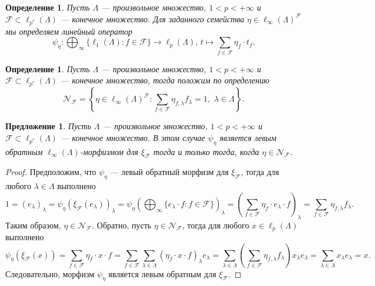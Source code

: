 \documentclass[12pt]{article}
\newtheorem{proposition}[theorem]{Предложение}
\newtheorem{definition}[theorem]{Определение}
\begin{document}
\begin{definition}\label{ParamExtMorph}
    Пусть $\Lambda$ --- произвольное множество, $1<p<+\infty$ 
    и $\mathcal{F}\subset \ell_{p^*}(\Lambda)$ --- 
    конечное множество. Для заданного семейства 
    $\eta\in \ell_\infty(\Lambda)^\mathcal{F}$ мы определяем линейный оператор
    \[
        \psi_{\eta}:
        \bigoplus_\infty\{\ell_1(\Lambda):f\in\mathcal{F}\}\to\ell_p(\Lambda),\,
        t\mapsto\sum_{f\in\mathcal{F}} \eta_f\cdot t_f.
    \]
\end{definition}

\begin{definition}\label{ExtMorphs}
    Пусть $\Lambda$ --- произвольное множество, $1<p<+\infty$ 
    и $\mathcal{F}\subset\ell_{p^*}(\Lambda)$ --- 
    конечное множество, тогда положим по определению
    \[
        \mathcal{N}_{\mathcal{F}}=\left\{
            \eta\in \ell_\infty(\Lambda)^{\mathcal{F}} : 
            \sum_{f\in\mathcal{F}} \eta_{f,\lambda}f_\lambda=1,\,\,
            \lambda\in\Lambda
        \right\}.
    \]
\end{definition}

\begin{proposition}\label{StdEmbdLeftInvCharac}
    Пусть $\Lambda$ --- произвольное множество, $1<p<+\infty$ 
    и $\mathcal{F}\subset\ell_{p^*}(\Lambda)$ --- 
    конечное множество. В этом случае $\psi_\eta$ является левым 
    обратным $\ell_\infty(\Lambda)$-морфизмом для $\xi_{\mathcal{F}}$ тогда и 
    только тогда, когда $\eta\in\mathcal{N}_{\mathcal{F}}$.
\end{proposition}
\begin{proof} 
    Предположим, что $\psi_{\eta}$ --- левый обратный морфизм 
    для $\xi_{\mathcal{F}}$, тогда для любого $\lambda\in\Lambda$ выполнено
    \[
        1=(e_\lambda)_\lambda
        =\psi_{\eta}(\xi_{\mathcal{F}}(e_\lambda))_\lambda
        =\psi_{\eta}\left(\bigoplus_\infty\{
            e_\lambda\cdot f: f\in\mathcal{F}
        \}\right)_\lambda
        =\left(
            \sum_{f\in\mathcal{F}} \eta_f\cdot e_\lambda\cdot f
        \right)_\lambda
        =\sum_{f\in\mathcal{F}} \eta_{f,\lambda}f_\lambda.
    \]
    Таким образом, $\eta\in\mathcal{N}_{\mathcal{F}}$.
    Обратно, пусть $\eta\in\mathcal{N}_{\mathcal{F}}$, тогда для 
    любого $x\in\ell_p(\Lambda)$ выполнено
    \[
        \psi_\eta(\xi_{\mathcal{F}}(x))
        =\sum_{f\in\mathcal{F}}\eta_f\cdot x\cdot f 
        =\sum_{f\in\mathcal{F}}\sum_{\lambda\in\Lambda} 
            (\eta_f\cdot x\cdot f)_\lambda e_\lambda 
        =\sum_{\lambda\in\Lambda} 
            \left(\sum_{f\in\mathcal{F}}\eta_{f,\lambda}f_\lambda\right) 
            x_\lambda e_\lambda 
        =\sum_{\lambda\in\Lambda} x_\lambda e_\lambda 
        =x. 
    \]
    Следовательно, морфизм $\psi_\eta$ является левым обратным 
    для $\xi_{\mathcal{F}}$.
\end{proof}
\end{document}
